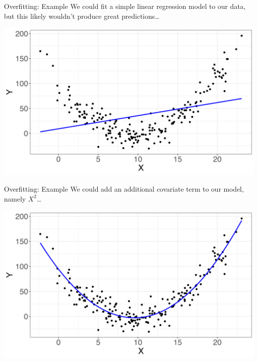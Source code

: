 \documentclass[10pt,t]{beamer}
\begin{document}
\begin{frame}{Overfitting: Example}
We could fit a simple linear regression model to our data, but this likely wouldn't produce great predictions\dots

\vspace{0.3cm}

\centering \includegraphics[scale=0.4]{figures/overfit2.png}
\end{frame}

\begin{frame}{Overfitting: Example}
We could add an additional covariate term to our model, namely $X^2$\dots

\vspace{0.3cm}

\centering \includegraphics[scale=0.4]{figures/overfit3.png}

\end{frame}
\end{document}
